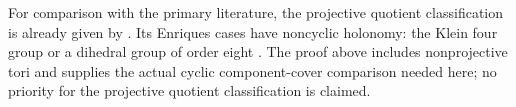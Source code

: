 For comparison with the primary literature, the projective
quotient classification is already given by
\cite[Theorem~2.1 and Lemma~3.4]{Yoshihara1995}.
Its Enriques cases have noncyclic holonomy: the Klein
four group or a dihedral group of order eight
\cite[Example~2.3 and Lemma~3.6]{Yoshihara1995}.
The proof above includes nonprojective tori and supplies
the actual cyclic component-cover comparison needed here;
no priority for the projective quotient classification
is claimed.

